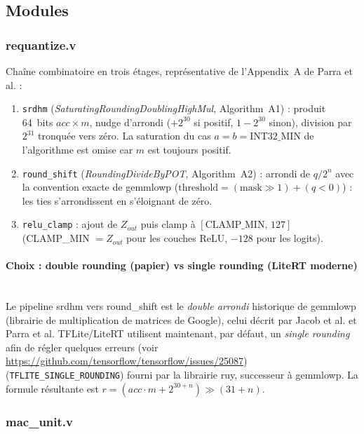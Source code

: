 \documentclass[11pt,a4paper]{article}
\begin{document}
\subsection{Modules}

\subsubsection{requantize.v}

Chaîne combinatoire en trois étages, représentative de l'Appendix~A de Parra
et al. :
\begin{enumerate}
  \item \texttt{srdhm} (\emph{SaturatingRoundingDoublingHighMul},
    Algorithm~A1) : produit 64~bits $acc \times m$, nudge d'arrondi ($+2^{30}$
    si positif, $1 - 2^{30}$ sinon), division par $2^{31}$ tronquée vers
    zéro. La saturation du cas $a = b = \text{INT32\_MIN}$ de l'algorithme
    est omise car $m$ est toujours positif.
  \item \texttt{round\_shift} (\emph{RoundingDivideByPOT}, Algorithm~A2) :
    arrondi de $q / 2^n$ avec la convention exacte de gemmlowp
    ($\text{threshold} = (\text{mask} \gg 1) + (q < 0)$) : les ties
    s'arrondissent en s'éloignant de zéro.
  \item \texttt{relu\_clamp} : ajout de $Z_{out}$ puis clamp à
    $[\text{CLAMP\_MIN},\, 127]$ (CLAMP\_MIN $= Z_{out}$ pour les couches
    ReLU, $-128$ pour les logits).
\end{enumerate}

\paragraph{Choix : double rounding (papier) vs single rounding (LiteRT
moderne)}\mbox{}\\

Le pipeline srdhm vers round\_shift est le \emph{double arrondi} historique
de gemmlowp (librairie de multiplication de matrices de Google), celui décrit
par Jacob et al. et Parra et al. TFLite/LiteRT utilisent maintenant, par
défaut, un \emph{single rounding} afin de régler quelques erreurs (voir
\url{https://github.com/tensorflow/tensorflow/issues/25087})
(\texttt{TFLITE\_SINGLE\_ROUNDING}) fourni par la librairie ruy, successeur à
gemmlowp. La formule résultante est
$r = (acc \cdot m + 2^{30+n}) \gg (31+n)$.

\subsubsection{mac\_unit.v}
\end{document}
